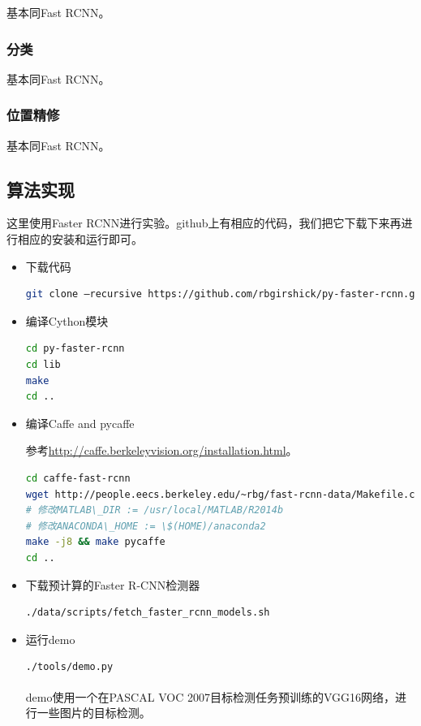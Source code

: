 \documentclass[a4paper, 12pt, UTF8]{article}
\begin{document}
基本同Fast RCNN。

\subsubsection{分类}

基本同Fast RCNN。

\subsubsection{位置精修}

基本同Fast RCNN。


\subsection{算法实现}

这里使用Faster RCNN进行实验。github上有相应的代码，我们把它下载下来再进行相应的安装和运行即可。

\begin{itemize}

\item 下载代码

\begin{lstlisting}[language={bash}]
git clone –recursive https://github.com/rbgirshick/py-faster-rcnn.git
\end{lstlisting}

\item 编译Cython模块

\begin{lstlisting}[language={bash}]
cd py-faster-rcnn
cd lib
make
cd ..
\end{lstlisting}

\item 编译Caffe and pycaffe

参考\url{http://caffe.berkeleyvision.org/installation.html}。

\begin{lstlisting}[language={bash}]
cd caffe-fast-rcnn
wget http://people.eecs.berkeley.edu/~rbg/fast-rcnn-data/Makefile.config
# 修改MATLAB\_DIR := /usr/local/MATLAB/R2014b
# 修改ANACONDA\_HOME := \$(HOME)/anaconda2
make -j8 && make pycaffe
cd ..
\end{lstlisting}

\item 下载预计算的Faster R-CNN检测器

\begin{lstlisting}[language={bash}]
./data/scripts/fetch_faster_rcnn_models.sh
\end{lstlisting}

\item 运行demo

\begin{lstlisting}[language={bash}]
./tools/demo.py
\end{lstlisting}

demo使用一个在PASCAL VOC 2007\textsuperscript{\cite{ref11}}目标检测任务预训练的VGG16网络，进行一些图片的目标检测。

\end{itemize}
\end{document}
